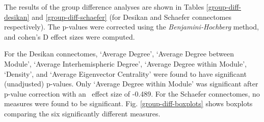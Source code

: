 \documentclass[11pt,conference]{IEEEtran}
\begin{document}
    The results of the group difference analyses are shown in Tables 
    \ref{group-diff-desikan} and \ref{group-diff-schaefer} (for Desikan and Schaefer 
    connectomes respectively). The p-values were corrected using the 
    \textit{Benjamini-Hochberg} method, and cohen's D effect sizes were computed.
    
    For the Desikan connectomes, `Average Degree', `Average Degree between Module', 
    `Average Interhemispheric Degree', `Average Degree within Module', `Density', and 
    `Average Eigenvector Centrality' were found to have significant (unadjusted) p-values. 
    Only `Average Degree within Module' was significant after p-value correction with an \
    effect size of -0.489. For the Schaefer connectomes, no measures were found to be 
    significant. Fig. \ref{group-diff-boxplots} shows boxplots comparing 
    the six significantly different measures.
\end{document}
